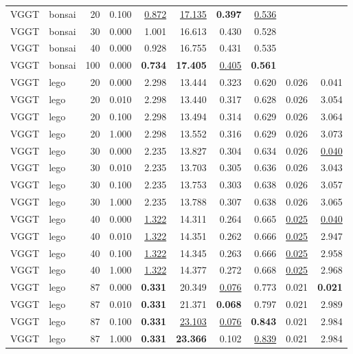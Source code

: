 \begin{table}[H]
\begin{tabular}{llrrrrrrrr}
VGGT & bonsai & 20 & 0.100 & \underline{0.872} & \underline{17.135} & \textbf{0.397} & \underline{0.536} &  &  \\
VGGT & bonsai & 30 & 0.000 & 1.001 & 16.613 & 0.430 & 0.528 &  &  \\
VGGT & bonsai & 40 & 0.000 & 0.928 & 16.755 & 0.431 & 0.535 &  &  \\
VGGT & bonsai & 100 & 0.000 & \textbf{0.734} & \textbf{17.405} & \underline{0.405} & \textbf{0.561} &  &  \\
\midrule
VGGT & lego & 20 & 0.000 & 2.298 & 13.444 & 0.323 & 0.620 & 0.026 & 0.041 \\
VGGT & lego & 20 & 0.010 & 2.298 & 13.440 & 0.317 & 0.628 & 0.026 & 3.054 \\
VGGT & lego & 20 & 0.100 & 2.298 & 13.494 & 0.314 & 0.629 & 0.026 & 3.064 \\
VGGT & lego & 20 & 1.000 & 2.298 & 13.552 & 0.316 & 0.629 & 0.026 & 3.073 \\
VGGT & lego & 30 & 0.000 & 2.235 & 13.827 & 0.304 & 0.634 & 0.026 & \underline{0.040} \\
VGGT & lego & 30 & 0.010 & 2.235 & 13.703 & 0.305 & 0.636 & 0.026 & 3.043 \\
VGGT & lego & 30 & 0.100 & 2.235 & 13.753 & 0.303 & 0.638 & 0.026 & 3.057 \\
VGGT & lego & 30 & 1.000 & 2.235 & 13.788 & 0.307 & 0.638 & 0.026 & 3.065 \\
VGGT & lego & 40 & 0.000 & \underline{1.322} & 14.311 & 0.264 & 0.665 & \underline{0.025} & \underline{0.040} \\
VGGT & lego & 40 & 0.010 & \underline{1.322} & 14.351 & 0.262 & 0.666 & \underline{0.025} & 2.947 \\
VGGT & lego & 40 & 0.100 & \underline{1.322} & 14.345 & 0.263 & 0.666 & \underline{0.025} & 2.958 \\
VGGT & lego & 40 & 1.000 & \underline{1.322} & 14.377 & 0.272 & 0.668 & \underline{0.025} & 2.968 \\
VGGT & lego & 87 & 0.000 & \textbf{0.331} & 20.349 & \underline{0.076} & 0.773 & 0.021 & \textbf{0.021} \\
VGGT & lego & 87 & 0.010 & \textbf{0.331} & 21.371 & \textbf{0.068} & 0.797 & 0.021 & 2.989 \\
VGGT & lego & 87 & 0.100 & \textbf{0.331} & \underline{23.103} & \underline{0.076} & \textbf{0.843} & 0.021 & 2.984 \\
VGGT & lego & 87 & 1.000 & \textbf{0.331} & \textbf{23.366} & 0.102 & \underline{0.839} & 0.021 & 2.984 \\
\bottomrule
\end{tabular}
\end{table}